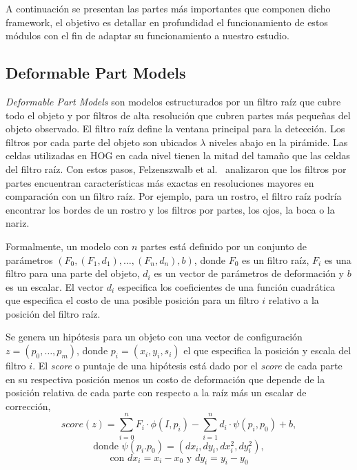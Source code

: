 A continuación se presentan las partes más importantes que componen dicho framework, el objetivo es detallar en profundidad el funcionamiento de estos módulos con el fin de adaptar su funcionamiento a nuestro estudio.

\subsection{Deformable Part Models}\label{subsec:dpm}
\textit{Deformable Part Models} son modelos estructurados por un filtro raíz que cubre todo el objeto y por filtros de alta resolución que cubren partes más pequeñas del objeto observado. El filtro raíz define la ventana principal para la detección. Los filtros por cada parte del objeto son ubicados $\lambda$ niveles abajo en la pirámide. Las celdas utilizadas en HOG en cada nivel tienen la mitad del tamaño que las celdas del filtro raíz.
Con estos pasos, Felzenszwalb et al.~\cite{Felzenszwalb2010, Felzenszwalb2013} analizaron que los filtros por partes encuentran características más exactas en resoluciones mayores en comparación con un filtro raíz. Por ejemplo, para un rostro, el filtro raíz podría encontrar los bordes de un rostro y los filtros por partes, los ojos, la boca o la nariz.

Formalmente, un modelo con $n$ partes está definido por un conjunto de parámetros $(F_{0}, (F_{1},d_{1}), \dots, (F_{n}, d_{n}), b)$, donde $F_{0}$ es un filtro raíz, $F_{i}$ es una filtro para una parte del objeto, $d_{i}$ es un vector de parámetros de deformación y $b$ es un escalar. El vector $d_{i}$ especifica los coeficientes de una función cuadrática que especifica el costo de una posible posición para un filtro $i$ relativo a la posición del filtro raíz.

Se genera un hipótesis para un objeto con una vector de configuración $z = (p_{0}, \dots, p_{m})$, donde $p_{i} = (x_{i}, y_{i}, s_{i})$ el que especifica la posición y escala del filtro $i$. El \textit{score} o puntaje de una hipótesis está dado por el \textit{score} de cada parte en su respectiva posición menos un costo de deformación que depende de la posición relativa de cada parte con respecto a la raíz más un escalar de corrección,
\begin{equation}
	\mathit{score}(z) = \sum_{i=0}^n F_{i} \cdot \phi(I, p_{i}) - \sum_{i=1}^{n} d_{i} \cdot \psi(p_{i},p_{0}) + b,
\end{equation}
$$ \text{donde }\psi(p_i. p_0) = (dx_i, dy_i, dx^{2}_i, dy^{2}_i),$$
$$ \text{con } dx_i = x_i-x_0 \text{ y } dy_i = y_i-y_0$$

